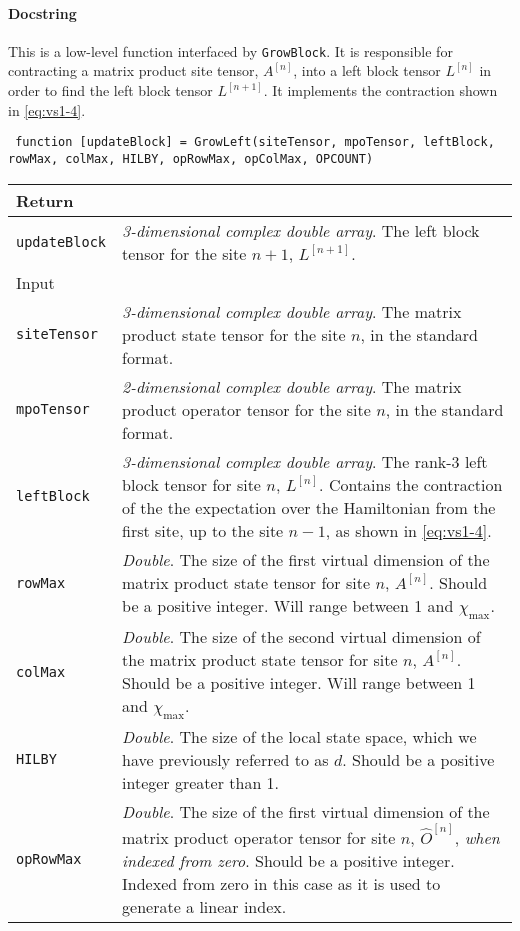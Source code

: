  \paragraph{Docstring} This is a low-level function interfaced by \lstinline$GrowBlock$. It is responsible for contracting a matrix product site tensor, \(A^{[n]}\), into a left block tensor \(L^{[n]}\) in order to find the left block tensor \(L^{[n+1]}\). It implements the contraction shown in \cref{eq:vs1-4}. 
 \begin{lstlisting}
 function [updateBlock] = GrowLeft(siteTensor, mpoTensor, leftBlock, rowMax, colMax, HILBY, opRowMax, opColMax, OPCOUNT) \end{lstlisting}
 \begin{longtabu}{X[1,l]X[4,l]}
 \hline
 Return & \\ \hline
 \lstinline$updateBlock$ & \emph{3-dimensional complex double array}. The left block tensor for the site \(n+1\), \(L^{[n+1]}\). \\ \hline
 Input & \\ \hline
 \lstinline$siteTensor$ & \emph{3-dimensional complex double array}. The matrix product state tensor for the site \(n\), in the standard format. \\
 \lstinline$mpoTensor$ & \emph{2-dimensional complex double array}. The matrix product operator tensor for the site \(n\), in the standard format. \\
 \lstinline$leftBlock$ & \emph{3-dimensional complex double array}. The rank-3 left block tensor for site \(n\), \(L^{[n]}\). Contains the contraction of the the expectation over the Hamiltonian from the first site, up to the site \(n-1\), as shown in \cref{eq:vs1-4}. \\
 \lstinline$rowMax$ & \emph{Double}. The size of the first virtual dimension of the matrix product state tensor for site \(n\), \(A^{[n]}\). Should be a positive integer. Will range between 1 and \(\chi_{\mathrm{max}}\).\\
 \lstinline$colMax$ & \emph{Double}. The size of the second virtual dimension of the matrix product state tensor for site \(n\), \(A^{[n]}\). Should be a positive integer. Will range between 1 and \(\chi_{\mathrm{max}}\).\\
 \lstinline$HILBY$ & \emph{Double}. The size of the local state space, which we have previously referred to as \(d\). Should be a positive integer greater than 1. \\
 \lstinline$opRowMax$ & \emph{Double}. The size of the first virtual dimension of the matrix product operator tensor for site \(n\), \(\hat{O}^{[n]}\), \emph{when indexed from zero}. Should be a positive integer. Indexed from zero in this case as it is used to generate a linear index. \\

\end{longtabu}
